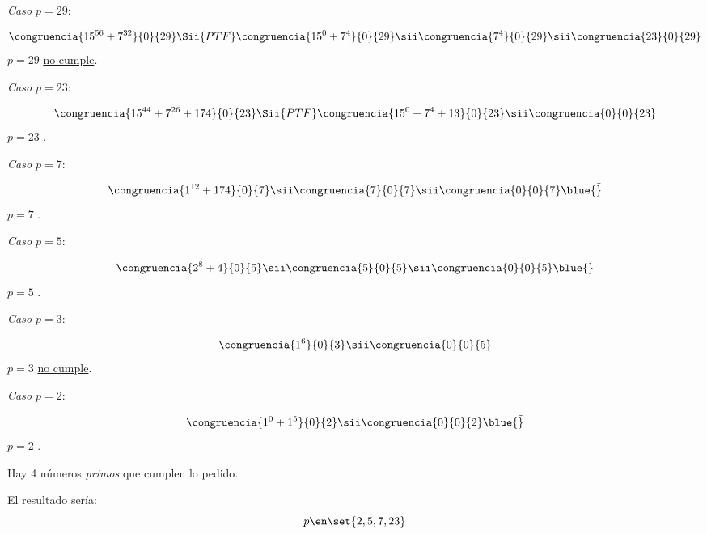 \begin{enumerate}[label={\tiny \magenta{\faIcon[regular]{gamepad}}}]
  \item
        \textit{Caso $p = 29$}:\par
        $$
          \congruencia{15^{56} + 7^{32} }{0}{29}
          \Sii{PTF}
          \congruencia{15^{0} + 7^{4} }{0}{29}
          \sii
          \congruencia{7^{4}}{0}{29}
          \sii
          \congruencia{23}{0}{29}
        $$
        $p = 29$ \underline{no cumple}.

  \item
        \textit{Caso $p = 23$}:\par
        $$
          \congruencia{15^{44} + 7^{26} + 174 }{0}{23}
          \Sii{PTF}
          \congruencia{15^0 + 7^4 + 13}{0}{23}
          \sii
          \congruencia{0}{0}{23}
        $$
        $p = 23$ .

  \item
        \textit{Caso $p = 7$}:\par
        $$
          \congruencia{1^{12} + 174}{0}{7}
          \sii
          \congruencia{7}{0}{7}
          \sii
          \congruencia{0}{0}{7} \blue{\Tilde}
        $$
        $p = 7$ .

  \item

        \textit{Caso $p = 5$}:\par
        $$
          \congruencia{ 2^8 + 4}{0}{5}
          \sii
          \congruencia{5}{0}{5}
          \sii
          \congruencia{0}{0}{5} \blue{\Tilde}
        $$
        $p = 5$ .

  \item
        \textit{Caso $p = 3$}:\par
        $$
          \congruencia{1^6}{0}{3}
          \sii
          \congruencia{0}{0}{5}
        $$
        $p = 3$ \underline{no cumple}.

  \item
        \textit{Caso $p = 2$}:\par
        $$
          \congruencia{1^0 + 1^5}{0}{2}
          \sii
          \congruencia{0}{0}{2} \blue{\Tilde}
        $$
        $p = 2$ .
\end{enumerate}

Hay 4 números \textit{primos} que cumplen lo pedido.

\bigskip

El resultado sería:
$$
  p \en \set{2, 5, 7, 23}
$$

\begin{aportes}
  \item {}
  \item {}
\end{aportes}
